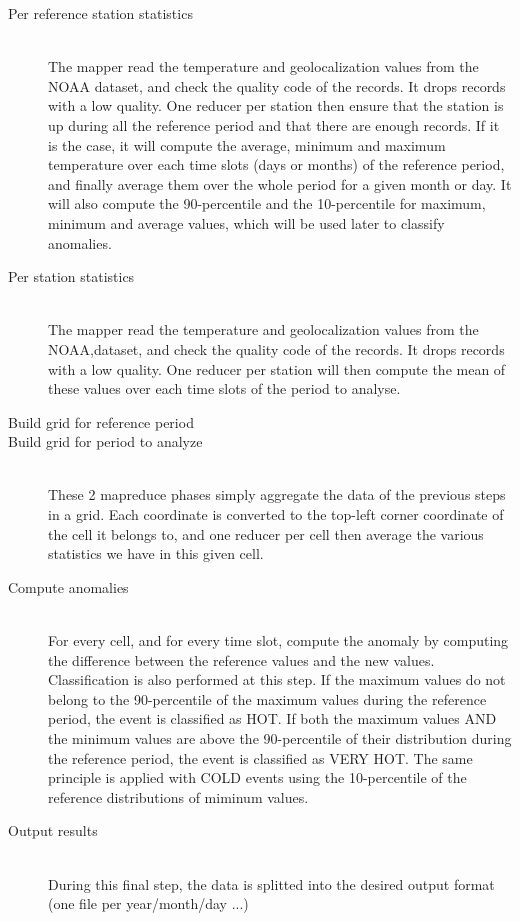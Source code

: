 \begin{description}
\item[Per reference station statistics] \hfill \\
The mapper read the temperature and geolocalization values from the NOAA dataset, and check the quality code of the records. It drops records with a low quality. One reducer per station then ensure that the station is up during all the reference period and that there are enough records. If it is the case, it will compute the average, minimum and maximum temperature over each time slots (days or months) of the reference period, and finally average them over the whole period for a given month or day. It will also compute the 90-percentile and the 10-percentile for maximum, minimum and average values, which will be used later to classify anomalies.
\item[Per station statistics] \hfill \\
The mapper read the temperature and geolocalization values from the NOAA,dataset, and check the quality code of the records. It drops records with a low quality. One reducer per station will then compute the mean of these values over each time slots of the period to analyse.
\item[Build grid for reference period]
\item[Build grid for period to analyze] \hfill \\
These 2 mapreduce phases simply aggregate the data of the previous steps in a grid. Each coordinate is converted to the top-left corner coordinate of the cell it belongs to, and one reducer per cell then average the various statistics we have in this given cell.
\item[Compute anomalies] \hfill \\
For every cell, and for every time slot, compute the anomaly by computing the difference between the reference values and the new values. Classification is also performed at this step. If the maximum values do not belong to the 90-percentile of the maximum values during the reference period, the event is classified as HOT. If both the maximum values AND the minimum values are above the 90-percentile of their distribution during the reference period, the event is classified as VERY HOT. The same principle is applied with COLD events using the 10-percentile of the reference distributions of miminum values.
\item[Output results] \hfill \\
During this final step, the data is splitted into the desired output format (one file per year/month/day ...)
\end{description}

